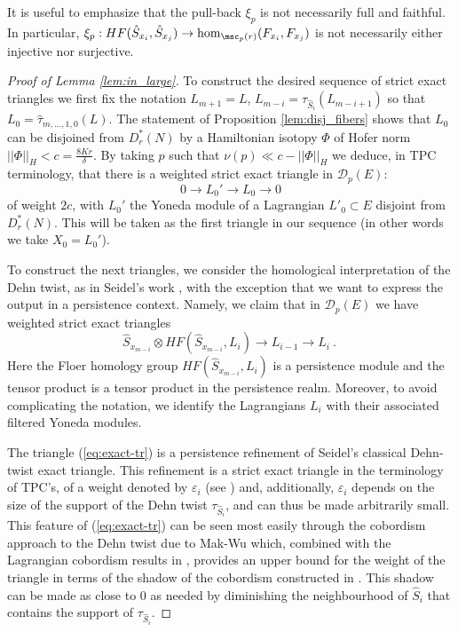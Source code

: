 \begin{rem} \label{rem:pull}
It is useful to emphasize that the pull-back $\xi_{p}$ is not necessarily full and faithful. In particular, 
 $\xi_{p}: HF(\hat{S}_{x_{i}},\hat{S}_{x_{j}})\to \hom_{\msc_{p}(r)}(F_{x_{i}}, F_{x_{j}})$ is not necessarily either injective nor surjective.
\end{rem}

\begin{proof}[Proof of Lemma \ref{lem:in_large}]
To construct the desired sequence of strict exact triangles we first fix the notation
$L_{m+1}=L$,  $L_{m-i}=\tau_{\hat{S}_{i}}(L_{m-i+1})$ so that $L_{0}=\hat{\tau}_{m,\ldots, 1,0}(L)$.
The statement of Proposition \ref{lem:disj_fibers} shows that $L_{0}$ can be  disjoined from $D^{\ast}_{r}(N)$ by a Hamiltonian isotopy $\Phi$ of Hofer norm $||\Phi||_{H} < c=\frac{8Kr}{\delta}$. 
By taking $p$ such that $\nu(p) \ll c- ||\Phi||_{H}$ we deduce, in TPC terminology,  that there is a weighted strict exact triangle in $\mathscr{D}_{p}(E)$:
\begin{equation}\label{eq:first-ex} 
0\longrightarrow L_{0}' \longrightarrow L_{0}\longrightarrow 0
\end{equation}
of weight $2c$, with $L_{0}'$ the Yoneda module of a Lagrangian  $L'_{0}\subset E$ disjoint from $D^{\ast}_{r}(N)$. This will be taken as the first triangle in our sequence (in other words we take $X_{0}=L_{0}'$). 

To construct the next triangles, 
we consider the homological interpretation of the Dehn twist, as
in Seidel's work  \cite{Se:book-fukaya-categ}, with the exception that we want to express the output  in a persistence context.  
Namely, we claim that in $\mathscr{D}_{p}(E)$ we have weighted strict exact triangles
\begin{equation}\label{eq:exact-tr}\hat{S}_{x_{m-i}}\otimes HF(\hat{S}_{x_{m-i}}, L_{i})\longrightarrow L_{i-1}\longrightarrow L_{i}~.~
\end{equation}
Here the Floer homology group $HF(\hat{S}_{x_{m-i}},L_{i})$ is a persistence module and the tensor product is a tensor product in the persistence realm. Moreover, to avoid complicating the notation, we identify the Lagrangians $L_{i}$ with their associated filtered Yoneda modules. 

The  triangle (\ref{eq:exact-tr}) is a persistence refinement of  Seidel's
classical Dehn-twist exact triangle.  This refinement is a strict exact triangle in the terminology of TPC's, of a weight denoted by $\varepsilon_{i}$ (see \cite{BCZ:tpc}) and, additionally, $\varepsilon_{i}$ depends on the size of the support of the Dehn twist $\tau_{\hat{S}_{i}}$, and can thus be made arbitrarily small.  This  feature of (\ref{eq:exact-tr})  can be seen most easily through the cobordism approach to the Dehn twist  due to Mak-Wu \cite{Mak-Wu:Dehn-twist} which, combined with the Lagrangian cobordism results in \cite{Bi-Co-Sh:LagrSh}, provides an upper bound for the weight of the triangle in terms of the shadow of the cobordism constructed in \cite{Mak-Wu:Dehn-twist}. This shadow can be made as close to $0$ as needed by diminishing the  neighbourhood of $\hat{S}_{i}$ that contains the support of $\tau_{\hat{S}_{i}}$.


\end{proof}
